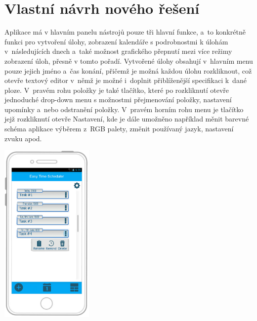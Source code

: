 \documentclass[a4paper, 11pt, twocolumn]{article}
\begin{document}
	\section*{\large{\centering Vlastní návrh nového řešení}}
	\vspace*{-0.2cm}
	Aplikace má v hlavním panelu nástrojů pouze tři hlavní funkce, a~to konkrétně funkci pro vytvoření úlohy, zobrazení kalendáře s podrobnostmi k úlohám 
	v~následujících dnech a~také možnost grafického přepnutí mezi více režimy zobrazení úloh, přesně v tomto pořadí. Vytvořené úlohy obsahují v~hlavním 
	menu pouze jejich jméno a~čas konání, přičemž je možná každou úlohu rozkliknout, což otevře textový editor v~němž je možné i~doplnit přiblíženější 
	specifikaci k~dané ploze. V~pravém rohu položky je také tlačítko, které po rozkliknutí otevře jednoduché drop-down menu s možnostmi přejmenování 
	položky, nastavení upomínky a~nebo odstranění položky. V~pravém horním rohu menu je tlačítko jejž rozkliknutí otevře Nastavení, kde je dále 
	umožněno například měnit barevné schéma aplikace výběrem z~RGB palety, změnit používaný jazyk, nastavení zvuku apod.
	\vspace*{-0.1cm}
	\begin{center}
	\includegraphics[width=0.34\textwidth]{timeplanner.png}
	\end{center}

	\newpage


\end{document}
